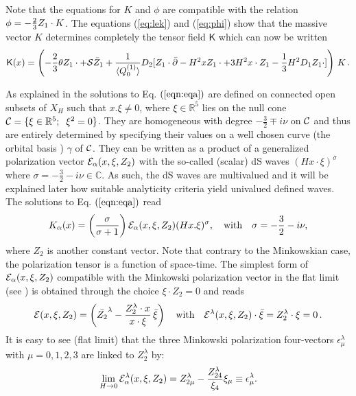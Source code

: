 \documentclass[a4paper,11pt,showpacs,preprintnumbers]{revtex4}
\def\setR{\mathbb{R}}
\def\setC{\mathbb{C}}
\def\K{\textsf{K}}
\begin{document}
Note that the equations for $K$ and $\phi$ are compatible with the
relation $\phi=-{{2}\over{3}}Z_{1}\cdot K$. The equations
(\ref{eq:lek}) and (\ref{eq:phi}) show that the massive vector $K$
determines completely the tensor field $\K$ which can now be
written
\begin{equation}\label{eq:wave2}
\K(x)=\left(-\frac{2}{3}\theta Z_1\cdot+{\cal S} \bar
Z_1+\frac{1}{ \langle Q_0^{(1)}\rangle}D_2[Z_1\cdot
\bar\partial-H^2xZ_1\cdot+3H^2 x\cdot Z_1 -\frac{1}{3}H^2 D_1
Z_1\cdot]\right) \,K\,.
\end{equation}

As explained in \cite{gata} the solutions  to Eq.
$(\ref{eqn:eqa})$ are defined on connected open subsets of $X_{H}$
such that $x . \xi \neq 0$, where $\xi \in \setR^5 $ lies on the
null cone ${\cal C} = \{ \xi \in \setR^5;\;\; \xi^2=0\}$. They are
homogeneous with degree $-\frac{3}{2}\mp i\nu$ on ${\cal C}$ and
thus are entirely determined by specifying their values on a well
chosen curve (the orbital basis ) $\gamma$ of ${\cal C}$. They can
be written \cite{gata} as a product of a generalized polarization
vector ${\cal E}_{\alpha}(x,\xi,Z_2)$ with the so-called
\cite{brmo}(scalar) dS waves $\left(Hx\cdot\xi\right)^{\sigma}$
where $\sigma=-\frac{3}{2}- i\nu\in \setC $. As such, the dS waves
are multivalued and it will be explained later how suitable
analyticity criteria yield univalued defined waves. The solutions
to Eq. $(\ref{eqn:eqa})$ read
\begin{equation}\label{eq:vector}
K_{\alpha}(x)=\left(\frac{\sigma}{\sigma+1}\right){\cal
E}_{\alpha}(x,\xi,Z_2)(Hx.\xi)^{\sigma},
\quad\mbox{with}\quad\sigma=-\frac{3}{2}- i\nu,
\end{equation}
where $Z_2$ is another constant vector.  Note that contrary to the
Minkowskian case, the polarization tensor is a function of
space-time. The simplest form of ${\cal E}_{\alpha}(x,\xi,Z_2)$
compatible with the Minkowski polarization vector in the flat
limit (see \cite {gata}) is obtained through the choice $\xi\cdot
Z_{2}=0$ and reads
\begin{equation}
{\cal E}(x,\xi,Z_2)=
\left(\bar{Z_{2}}^{\lambda}-\frac{Z_{2}^{\lambda}\cdot x}{x\cdot
\xi}\,\bar{\xi}\right)\quad\mbox{with}\quad{\cal
E}^{\lambda}(x,\xi,Z_2)\cdot \bar\xi=Z_{2}^{\lambda}\cdot\xi =0
\,. \label{eq:vect}
\end{equation}
It is easy to see (flat limit) that the three  Minkowski
polarization four-vectors $\epsilon_{\mu}^{\lambda}$ with
$\mu=0,1,2,3$ are linked to $Z^{\lambda}_2$ by:
\begin{equation}\label{eq:vectlim}
\lim_{H\rightarrow 0}{\cal
E}_{\alpha}^{\lambda}(x,\xi,Z_2)=Z_{2\mu}^{\lambda}-\frac{Z_{24}^{\lambda}}{\xi_{4}}\xi_{\mu}\equiv\epsilon_{\mu}^{\lambda}.
\end{equation}
\end{document}
